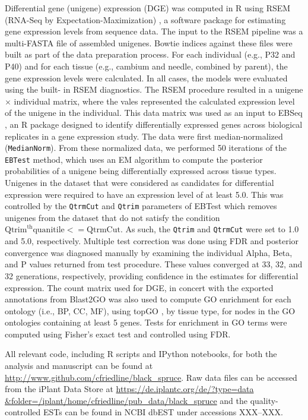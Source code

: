 \documentclass[11pt]{article}
\begin{document}
Differential gene (unigene) expression (DGE) was computed in R \citep[v.
3.1.1]{R} using RSEM (RNA-Seq by Expectation-Maximization) \citep[v.
1.2.15]{Li:BmcBioinformatics:2011}, a software package for estimating gene
expression levels from sequence data.  The input to the RSEM pipeline was a
multi-FASTA file of assembled unigenes.  Bowtie indices \citep[v.
2.2.3]{Langmead:NatMethods:2012} against these files were built as part of the
data preparation process.  For each individual (e.g., P32 and P40) and for each
tissue (e.g., cambium and needle, combined by parent), the gene expression
levels were calculated. In all cases, the models were evaluated using the built-
in RSEM diagnostics.  The RSEM procedure resulted in a unigene $\times$
individual matrix, where the vales represented the calculated expression level
of the unigene in the individual.  This data matrix was used as an input to
EBSeq \citep[v. 1.4.0]{Leng:Bioinformatics:2013}, an R package designed to
identify differentially expressed genes across biological replicates in a gene
expression study. The data were first median-normalized (\texttt{MedianNorm}).
From these normalized data, we performed 50 iterations of the \texttt{EBTest}
method, which uses an EM algorithm to compute the posterior probabilities of a
unigene being differentially expressed across tissue types. Unigenes in the
dataset that were considered as candidates for differential expression were
required to have an expression level of at least 5.0.  This was controlled by
the \texttt{QtrmCut} and \texttt{Qtrim} parameters of EBTest which removes
unigenes from the dataset that do not satisfy the condition
$\text{Qtrim}^{\text{th}} \text{quanitile} <= \text{QtrmCut}$.  As such, the
\texttt{Qtrim} and \texttt{QtrmCut} were set to 1.0 and 5.0, respectively.
Multiple test correction was done using FDR \citep{benjamini1995controlling} and
posterior convergence was diagnosed manually by examining the individual Alpha,
Beta, and P values returned from test procedure.  These values converged at 33,
32, and 32 generations, respectively, providing confidence in the estimates for
differential expression. The count matrix used for DGE, in concert with the
exported annotations from Blast2GO was also used to compute GO enrichment for
each ontology (i.e., BP, CC, MF), using topGO \citep{topgo}, by tissue type, for
nodes in the GO ontologies containing at least 5 genes.  Tests for enrichment in
GO terms were computed using Fisher's exact test and controlled using FDR.

All relevant code, including R scripts and IPython notebooks, for both the
analysis and manuscript can be found at
\url{http://www.github.com/cfriedline/black_spruce}.  Raw data files can be
accessed from the iPlant Data Store at \url{https://de.iplantc.org/de/?type=data
&folder=/iplant/home/cfriedline/pub_data/black_spruce} and the quality-
controlled ESTs can be found in NCBI dbEST under accessions XXX--XXX.
\end{document}
